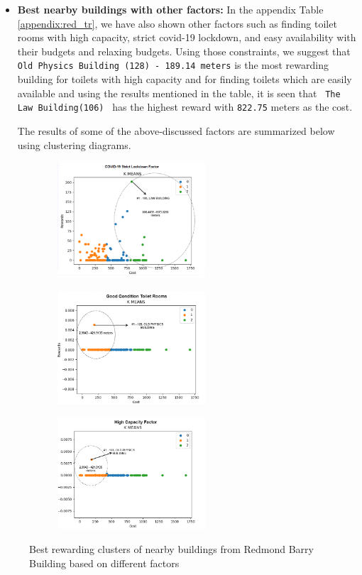 \begin{itemize}
\item \textbf{Best nearby buildings with other factors:} In the appendix Table \ref{appendix:red_tr}, we have also shown other factors such as finding toilet rooms with high capacity, strict covid-19 lockdown, and easy availability with their budgets and relaxing budgets. Using those constraints, we suggest that \texttt{Old Physics Building (128) - 189.14 meters} is the most rewarding building for toilets with high capacity and for finding toilets which are easily available and using the results mentioned in the table, it is seen that \texttt{ The Law Building(106) } has the highest reward with \texttt{822.75} meters as the cost.

The results of some of the above-discussed factors are summarized below using clustering diagrams.
\end{itemize}

\begin{figure}[H]
\centering
\begin{subfigure}[b]{0.30\textwidth}
  \centering
  \includegraphics[width=5.5cm,keepaspectratio=true]{resources/images/spatial-tr/115_covidplot.png}
\end{subfigure}
\begin{subfigure}[b]{0.30\textwidth}
  \centering
  \includegraphics[width=5.5cm,keepaspectratio=true]{resources/images/spatial-tr/115_goodplot.png}
\end{subfigure}
\begin{subfigure}[b]{0.30\textwidth}
  \centering
  \includegraphics[width=5.5cm,keepaspectratio=true]{resources/images/spatial-tr/115_highplot.png}
\end{subfigure}
\caption{Best rewarding clusters of nearby buildings from Redmond Barry Building based on different factors}
\label{fig:redmond_factors}
\end{figure}

